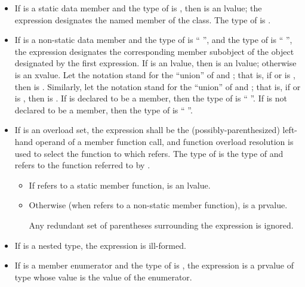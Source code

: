 \begin{itemize}
\item If  is a static data member and the type of 
is , then  is an lvalue; the expression designates
the named member of the class. The type of  is .

\item If  is a non-static data member and the type of
 is `` '', and the type of 
is `` '', the expression designates the corresponding
member subobject of the object designated by the first expression. If 
is an lvalue, then  is an lvalue;
otherwise  is an xvalue.
Let the notation  stand for the ``union'' of
 and ; that is, if  or 
is , then  is . Similarly,
let the notation  stand for the ``union'' of 
and ; that is, if  or  is
, then  is . If  is
declared to be a  member, then the type of 
is `` ''. If  is not declared to be a
 member, then the type of  is
``  ''.

\item If  is an overload set,
the expression shall be the (possibly-parenthesized) left-hand operand of
a member function call, and
function overload resolution
is used to select the function to which  refers.
The type of  is the type of 
and  refers to the function referred to by .

\begin{itemize}
\item If  refers to a static member function,
 is an lvalue.

\item Otherwise (when  refers to a non-static member function),
 is a prvalue.
\begin{note}
Any redundant set of parentheses surrounding the expression
is ignored.
\end{note}
\end{itemize}

\item If  is a nested type, the expression  is
ill-formed.

\item If  is a member enumerator and the type of 
is , the expression  is a prvalue of type 
whose value is the value of the enumerator.
\end{itemize}


